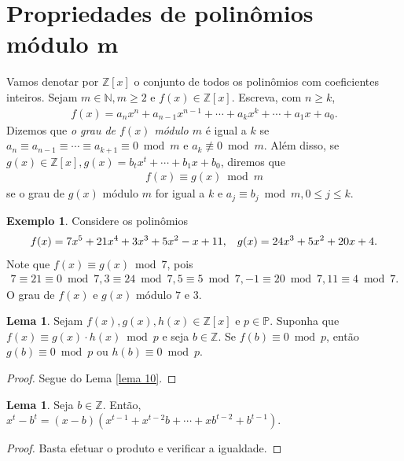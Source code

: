 \documentclass[a4paper,11pt,twoside, leqno]{article}
\theoremstyle{definition}
\newtheorem{lemma}[theorem]{Lema}
\newtheorem*{example}{Exemplo}
\begin{document}
\section{Propriedades de polinômios módulo $\mathbf{m}$}
\hspace{12pt} Vamos denotar por $\mathbb{Z}[x]$ o conjunto de todos os polinômios com coeficientes inteiros. Sejam $m\in\mathbb{N}, m\geq 2$ e $f(x)\in\mathbb{Z}[x]$. Escreva, com $n\geq k$,
\begin{align*}
f(x) = a_nx^n + a_{n-1}x^{n-1} + \cdots + a_kx^k + \cdots + a_1x + a_0.
\end{align*}
Dizemos que {\em o grau de $f(x)$ módulo $m$} é igual a $k$ se $a_n\equiv a_{n-1}\equiv\cdots\equiv a_{k+1}\equiv 0\bmod m$ e $a_k\not\equiv 0\bmod m$. Além disso, se $g(x)\in\mathbb{Z}[x], g(x) = b_tx^t + \cdots + b_1x + b_0$, diremos que
\begin{align*}
f(x)\equiv g(x)\bmod m
\end{align*}
se o grau de $g(x)$ módulo $m$ for igual a $k$ e $a_j\equiv b_j\bmod m, 0\leq j\leq k$.
\begin{example}
	Considere os polinômios 
	\begin{align*}
	f(x) = 7x^5 + 21x^4 + 3x^3 + 5x^2 - x + 11, \hspace{0.3cm} g(x) = 24x^3 + 5x^2 + 20x + 4.
	\end{align*}
	Note que $f(x)\equiv g(x)\bmod 7$, pois
	\begin{align*}
	7\equiv 21\equiv 0\bmod 7, 3\equiv 24\bmod 7, 5\equiv 5\bmod 7, -1\equiv 20\bmod 7, 11\equiv 4\bmod 7.
	\end{align*}
	O grau de $f(x)$ e $g(x)$ módulo $7$ e $3$.
\end{example}
\begin{lemma}
	\label{lema 60}
	Sejam $f(x),g(x),h(x)\in\mathbb{Z}[x]$ e $p\in\mathbb{P}$. Suponha que $f(x)\equiv g(x)\cdot h(x)\bmod p$ e seja $b\in\mathbb{Z}$. Se $f(b)\equiv 0\bmod p$, então $g(b)\equiv 0\bmod p$ ou $h(b)\equiv 0\bmod p$.
\end{lemma}
\begin{proof}
	Segue do Lema \eqref{lema 10}.
\end{proof}
\begin{lemma}
	\label{lema 61}
	Seja $b\in\mathbb{Z}$. Então, $x^t - b^t = (x-b)(x^{t-1} + x^{t-2}b + \cdots + xb^{t-2} + b^{t-1})$.
\end{lemma}
\begin{proof}
	Basta efetuar o produto e verificar a igualdade.
\end{proof}
\end{document}

